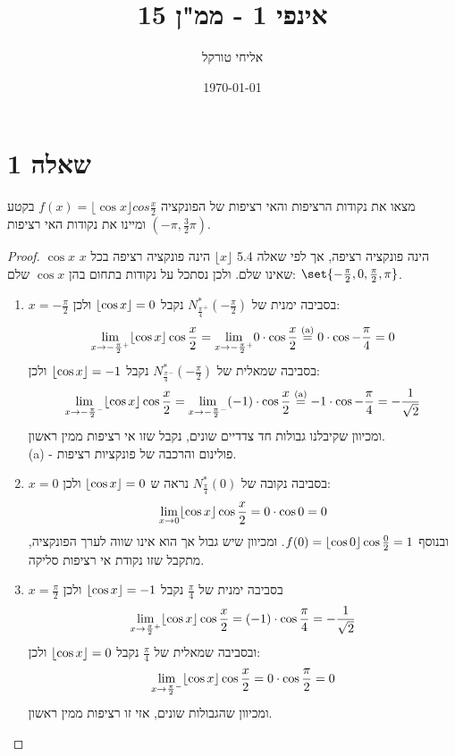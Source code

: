\documentclass{article}
\title{אינפי 1 - ממ"ן 15}
\author{אליחי טורקל \ID}
\date\today
\DeclarePairedDelimiter\set\{\}
\begin{document}
	\maketitle %

	\section*{שאלה 1}
	מצאו את נקודות הרציפות והאי רציפות של הפונקציה
	$f(x) = \lfloor \cos x \rfloor cos \frac{x}{2}$
	בקטע $(-\pi, \frac{3}{2}\pi)$ ומיינו את נקודות האי רציפות. \\
	\begin{proof}
		$\cos x$ הינה פונקציה רציפה, אך לפי שאלה 5.4 $\lfloor x \rfloor$ הינה פונקציה רציפה בכל $x$ שאינו שלם.
		ולכן נסתכל על נקודות בתחום בהן $\cos x$ שלם: $\set{-\frac{\pi}{2}, 0, \frac{\pi}{2}, \pi}$. \\
		\begin{enumerate}
			\item $x = - \frac{\pi}{2}$ בסביבה ימנית של $N^{*}_{\frac{\pi}{4}^+}(-\frac{\pi}{2})$ נקבל $\lfloor \cos x \rfloor = 0$ ולכן:
			\[
				\displaystyle{\lim_{x \to -\frac{\pi}{2}^+}} \lfloor \cos x \rfloor \cos \frac{x}{2} =
				\displaystyle{\lim_{x \to -\frac{\pi}{2}^+}} 0 \cdot \cos \frac{x}{2} \overset{\text{(a)}}=
				0 \cdot \cos - \frac{\pi}{4} = 0
			\]
			בסביבה שמאלית של $N^{*}_{\frac{\pi}{4}^-}(-\frac{\pi}{2})$
			נקבל $\lfloor \cos x \rfloor = -1$ ולכן:
			\[
				\displaystyle{\lim_{x \to -\frac{\pi}{2}^-}} \lfloor \cos x \rfloor \cos \frac{x}{2} =
				\displaystyle{\lim_{x \to -\frac{\pi}{2}^-}} (-1) \cdot \cos \frac{x}{2} \overset{\text{(a)}}=
				-1 \cdot \cos - \frac{\pi}{4} = - \frac{1}{\sqrt{2}}
			\]
			ומכיוון שקיבלנו גבולות חד צדדיים שונים, נקבל שזו אי רציפות ממין ראשון. \\
			(a) - פולינום והרכבה של פונקציות רציפות.

			\item $x = 0$ בסביבה נקובה של $N^{*}_{\frac{\pi}{4}}(0)$ נראה ש $\lfloor \cos x \rfloor = 0$ ולכן:
			\[
				\displaystyle{\lim_{x \to 0}} \lfloor \cos x \rfloor \cos \frac{x}{2} =
				0 \cdot \cos 0 = 0
			\]
			ובנוסף $f(0) = \lfloor \cos 0 \rfloor \cos \frac{0}{2}=1$.
			ומכיוון שיש גבול אך הוא אינו שווה לערך הפונקציה, מתקבל שזו נקודת אי רציפות סליקה.

			\item $x = \frac{\pi}{2}$ בסביבה ימנית של $\frac{\pi}{4}$ נקבל $\lfloor \cos x \rfloor = -1$ ולכן
			\[
				\displaystyle{\lim_{x \to \frac{\pi}{2}^+}} \lfloor \cos x \rfloor \cos \frac{x}{2} =
				(-1) \cdot \cos \frac{\pi}{4} = -\frac{1}{\sqrt{2}}
			\]
			ובסביבה שמאלית של $\frac{\pi}{4}$ נקבל $\lfloor \cos x \rfloor = 0$ ולכן:
			\[
				\displaystyle{\lim_{x \to \frac{\pi}{2}^-}} \lfloor \cos x \rfloor \cos \frac{x}{2} =
				0 \cdot \cos \frac{\pi}{2} = 0
			\]
			ומכיוון שהגבולות שונים, אזי זו רציפות ממין ראשון.


\end{enumerate}
\end{proof}
\end{document}
